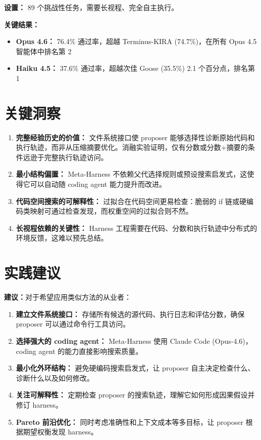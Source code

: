 \documentclass[12pt,a4paper]{article}
\newcommand{\suggestion}[1]{\textbf{建议：}#1}
\begin{document}
\textbf{设置：} 89 个挑战性任务，需要长视程、完全自主执行。

\textbf{关键结果：}
\begin{itemize}
    \item \textbf{Opus 4.6：} 76.4\% 通过率，超越 Terminus-KIRA (74.7\%)，在所有 Opus 4.5 智能体中排名第 2
    \item \textbf{Haiku 4.5：} 37.6\% 通过率，超越次佳 Goose (35.5\%) 2.1 个百分点，排名第 1
\end{itemize}

\section{关键洞察}

\begin{tcolorbox}[colback=blue!5,colframe=blue!50,title=核心洞察]
\begin{enumerate}
    \item \textbf{完整经验历史的价值：} 文件系统接口使 proposer 能够选择性诊断原始代码和执行轨迹，而非从压缩摘要优化。消融实验证明，仅有分数或分数+摘要的条件远逊于完整执行轨迹访问。
    
    \item \textbf{最小结构偏置：} Meta-Harness 不依赖父代选择规则或预设搜索启发式，这使得它可以自动随 coding agent 能力提升而改进。
    
    \item \textbf{代码空间搜索的可解释性：} 过拟合在代码空间更易检查：脆弱的 if 链或硬编码类映射可通过检查发现，而权重空间的过拟合则不然。
    
    \item \textbf{长视程依赖的关键性：} Harness 工程需要在代码、分数和执行轨迹中分布式的环境反馈，这难以预先总结。
\end{enumerate}
\end{tcolorbox}

\section{实践建议}

\suggestion{对于希望应用类似方法的从业者：}

\begin{enumerate}
    \item \textbf{建立文件系统接口：} 存储所有候选的源代码、执行日志和评估分数，确保 proposer 可以通过命令行工具访问。
    
    \item \textbf{选择强大的 coding agent：} Meta-Harness 使用 Claude Code (Opus-4.6)，coding agent 的能力直接影响搜索质量。
    
    \item \textbf{最小化外环结构：} 避免硬编码搜索启发式，让 proposer 自主决定检查什么、诊断什么以及如何修改。
    
    \item \textbf{关注可解释性：} 定期检查 proposer 的搜索轨迹，理解它如何形成因果假设并修订 harness。
    
    \item \textbf{Pareto 前沿优化：} 同时考虑准确性和上下文成本等多目标，让 proposer 根据期望权衡发现 harness。
\end{enumerate}
\end{document}
